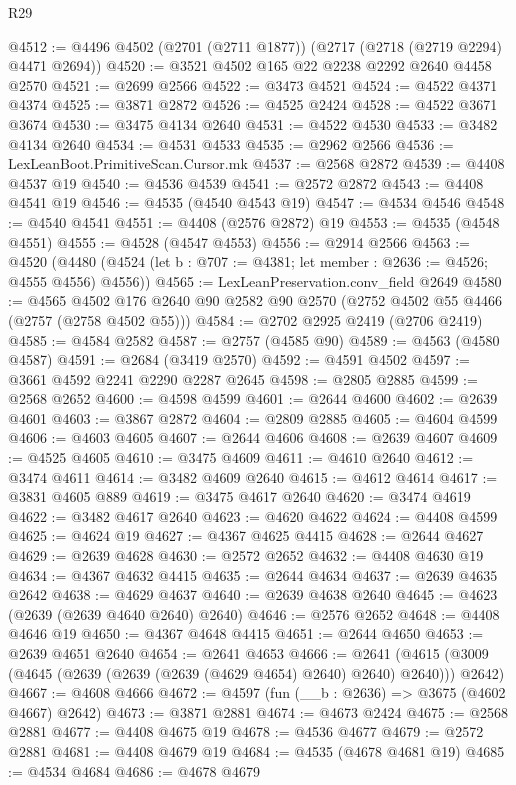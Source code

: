 \begin{lexlean}{R29}
\begin{coremodule}
@4512 := @4496 @4502 (@2701 (@2711 @1877)) (@2717 (@2718 (@2719 @2294) @4471 @2694))
@4520 := @3521 @4502 @165 @22 @2238 @2292 @2640 @4458 @2570
@4521 := @2699 @2566
@4522 := @3473 @4521
@4524 := @4522 @4371 @4374
@4525 := @3871 @2872
@4526 := @4525 @2424
@4528 := @4522 @3671 @3674
@4530 := @3475 @4134 @2640
@4531 := @4522 @4530
@4533 := @3482 @4134 @2640
@4534 := @4531 @4533
@4535 := @2962 @2566
@4536 := LexLeanBoot.PrimitiveScan.Cursor.mk
@4537 := @2568 @2872
@4539 := @4408 @4537 @19
@4540 := @4536 @4539
@4541 := @2572 @2872
@4543 := @4408 @4541 @19
@4546 := @4535 (@4540 @4543 @19)
@4547 := @4534 @4546
@4548 := @4540 @4541
@4551 := @4408 (@2576 @2872) @19
@4553 := @4535 (@4548 @4551)
@4555 := @4528 (@4547 @4553)
@4556 := @2914 @2566
@4563 := @4520
    (@4480 (@4524 (let b : @707 := @4381; let member : @2636 := @4526; @4555 @4556) @4556))
@4565 := LexLeanPreservation.conv_field @2649
@4580 := @4565
    @4502
    @176
    @2640
    @90
    @2582
    @90
    @2570
    (@2752 @4502 @55 @4466 (@2757 (@2758 @4502 @55)))
@4584 := @2702 @2925 @2419 (@2706 @2419)
@4585 := @4584 @2582
@4587 := @2757 (@4585 @90)
@4589 := @4563 (@4580 @4587)
@4591 := @2684 (@3419 @2570)
@4592 := @4591 @4502
@4597 := @3661 @4592 @2241 @2290 @2287 @2645
@4598 := @2805 @2885
@4599 := @2568 @2652
@4600 := @4598 @4599
@4601 := @2644 @4600
@4602 := @2639 @4601
@4603 := @3867 @2872
@4604 := @2809 @2885
@4605 := @4604 @4599
@4606 := @4603 @4605
@4607 := @2644 @4606
@4608 := @2639 @4607
@4609 := @4525 @4605
@4610 := @3475 @4609
@4611 := @4610 @2640
@4612 := @3474 @4611
@4614 := @3482 @4609 @2640
@4615 := @4612 @4614
@4617 := @3831 @4605 @889
@4619 := @3475 @4617 @2640
@4620 := @3474 @4619
@4622 := @3482 @4617 @2640
@4623 := @4620 @4622
@4624 := @4408 @4599
@4625 := @4624 @19
@4627 := @4367 @4625 @4415
@4628 := @2644 @4627
@4629 := @2639 @4628
@4630 := @2572 @2652
@4632 := @4408 @4630 @19
@4634 := @4367 @4632 @4415
@4635 := @2644 @4634
@4637 := @2639 @4635 @2642
@4638 := @4629 @4637
@4640 := @2639 @4638 @2640
@4645 := @4623 (@2639 (@2639 @4640 @2640) @2640)
@4646 := @2576 @2652
@4648 := @4408 @4646 @19
@4650 := @4367 @4648 @4415
@4651 := @2644 @4650
@4653 := @2639 @4651 @2640
@4654 := @2641 @4653
@4666 := @2641 (@4615 (@3009 (@4645 (@2639 (@2639 (@2639 (@4629 @4654) @2640) @2640) @2640))) @2642)
@4667 := @4608 @4666
@4672 := @4597 (fun (__b : @2636) => @3675 (@4602 @4667) @2642)
@4673 := @3871 @2881
@4674 := @4673 @2424
@4675 := @2568 @2881
@4677 := @4408 @4675 @19
@4678 := @4536 @4677
@4679 := @2572 @2881
@4681 := @4408 @4679 @19
@4684 := @4535 (@4678 @4681 @19)
@4685 := @4534 @4684
@4686 := @4678 @4679

\end{coremodule}
\end{lexlean}

